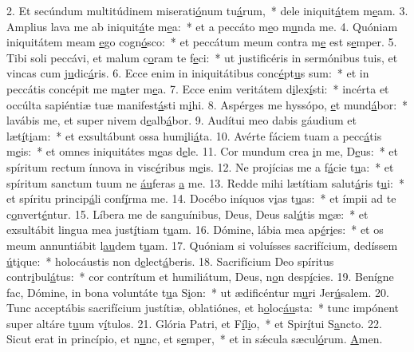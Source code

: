 2. Et secúndum multitúdinem miserati\uline{ó}num tu\uline{á}rum,~* dele iniquit\uline{á}tem m\uline{e}am.
3. Amplius lava me ab iniquit\uline{á}te m\uline{e}a:~* et a peccáto m\uline{e}o m\uline{u}nda me.
4. Quóniam iniquitátem meam \uline{e}go cogn\uline{ó}sco:~* et peccátum meum contra m\uline{e} est s\uline{e}mper.
5. Tibi soli peccávi, et malum c\uline{o}ram te f\uline{e}ci:~* ut justificéris in sermónibus tuis, et vincas cum j\uline{u}dic\uline{á}ris.
6. Ecce enim in iniquitátibus conc\uline{é}pt\uline{u}s sum:~* et in peccátis concépit me m\uline{a}ter m\uline{e}a.
7. Ecce enim veritátem d\uline{i}lex\uline{í}sti:~* incérta et occúlta sapiéntiæ tuæ manifest\uline{á}sti m\uline{i}hi.
8. Aspérges me hyssópo, \uline{e}t mund\uline{á}bor:~* lavábis me, et super nivem d\uline{e}alb\uline{á}bor.
9. Audítui meo dabis gáudium et læt\uline{í}t\uline{i}am:~* et exsultábunt ossa hum\uline{i}li\uline{á}ta.
10. Avérte fáciem tuam a pecc\uline{á}tis m\uline{e}is:~* et omnes iniquitátes m\uline{e}as d\uline{e}le.
11. Cor mundum crea \uline{i}n me, D\uline{e}us:~* et spíritum rectum ínnova in visc\uline{é}ribus m\uline{e}is.
12. Ne projícias me a f\uline{á}cie t\uline{u}a:~* et spíritum sanctum tuum ne \uline{áu}feras \uline{a} me.
13. Redde mihi lætítiam salut\uline{á}ris t\uline{u}i:~* et spíritu princip\uline{á}li conf\uline{í}rma me.
14. Docébo iníquos v\uline{i}as t\uline{u}as:~* et ímpii ad te c\uline{o}nvert\uline{é}ntur.
15. Líbera me de sanguínibus, Deus, Deus sal\uline{ú}tis m\uline{e}æ:~* et exsultábit lingua mea just\uline{í}tiam t\uline{u}am.
16. Dómine, lábia mea ap\uline{é}r\uline{i}es:~* et os meum annuntiábit l\uline{au}dem t\uline{u}am.
17. Quóniam si voluísses sacrifícium, dedíssem \uline{ú}t\uline{i}que:~* holocáustis non d\uline{e}lect\uline{á}beris.
18. Sacrifícium Deo spíritus contr\uline{i}bul\uline{á}tus:~* cor contrítum et humiliátum, Deus, n\uline{o}n desp\uline{í}cies.
19. Benígne fac, Dómine, in bona voluntáte t\uline{u}a S\uline{i}on:~* ut ædificéntur m\uline{u}ri Jer\uline{ú}salem.
20. Tunc acceptábis sacrifícium justítiæ, oblatiónes, et h\uline{o}loc\uline{áu}sta:~* tunc impónent super altáre t\uline{u}um v\uline{í}tulos.
21. Glória Patri, et F\uline{í}l\uline{i}o,~* et Spir\uline{í}tui S\uline{a}ncto.
22. Sicut erat in princípio, et n\uline{u}nc, et s\uline{e}mper,~* et in sǽcula sæcul\uline{ó}rum. \uline{A}men.
